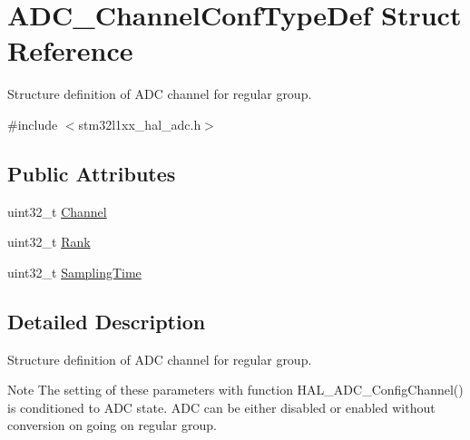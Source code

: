 \hypertarget{struct_a_d_c___channel_conf_type_def}{\section{A\-D\-C\-\_\-\-Channel\-Conf\-Type\-Def Struct Reference}
\label{struct_a_d_c___channel_conf_type_def}
}


Structure definition of A\-D\-C channel for regular group.  




{\ttfamily \#include $<$stm32l1xx\-\_\-hal\-\_\-adc.\-h$>$}

\subsection*{Public Attributes}
\begin{DoxyCompactItemize}
\item 
uint32\-\_\-t \hyperlink{struct_a_d_c___channel_conf_type_def_a771e64a3695f61cb1cce4fd65e956f6b}{Channel}
\item 
uint32\-\_\-t \hyperlink{struct_a_d_c___channel_conf_type_def_a106e52a928aefb7778802bac0b75cf2d}{Rank}
\item 
uint32\-\_\-t \hyperlink{struct_a_d_c___channel_conf_type_def_ae9486a657d515b87e2c2853db59afaaa}{Sampling\-Time}
\end{DoxyCompactItemize}


\subsection{Detailed Description}
Structure definition of A\-D\-C channel for regular group. 

\begin{DoxyNote}{Note}
The setting of these parameters with function H\-A\-L\-\_\-\-A\-D\-C\-\_\-\-Config\-Channel() is conditioned to A\-D\-C state. A\-D\-C can be either disabled or enabled without conversion on going on regular group. 
\end{DoxyNote}


